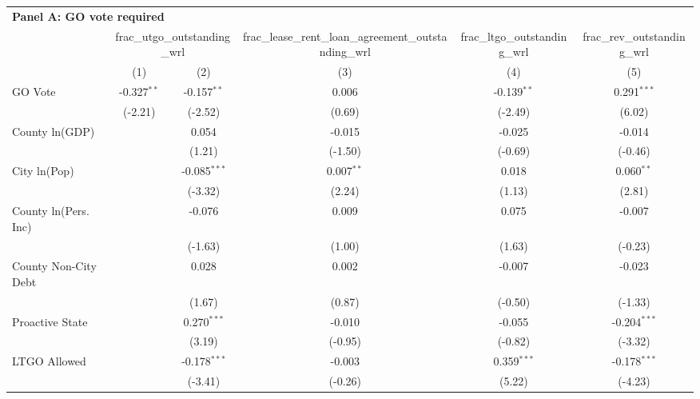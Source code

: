 \begingroup
\centering
\begin{tabular*}{\textwidth}{@{\extracolsep{\fill}}lccccc}
\multicolumn{5}{l}{\textbf{Panel A: GO vote required}}\\

\addlinespace
   \toprule
    & \multicolumn{2}{c}{frac\_utgo\_outstanding\_wrl} & frac\_lease\_rent\_loan\_agreement\_outstanding\_wrl & frac\_ltgo\_outstanding\_wrl & frac\_rev\_outstanding\_wrl\\
   \cmidrule(lr){2-3}\cmidrule(lr){4-4}\cmidrule(lr){5-5}\cmidrule(lr){6-6}
                        & (1)           & (2)            & (3)          & (4)           & (5)\\  
   \midrule 
   GO Vote              & -0.327$^{**}$ & -0.157$^{**}$  & 0.006        & -0.139$^{**}$ & 0.291$^{***}$\\   
                        & (-2.21)      & (-2.52)       & (0.69)      & (-2.49)      & (6.02)\\   
   County ln(GDP)       &               & 0.054          & -0.015       & -0.025        & -0.014\\   
                        &               & (1.21)        & (-1.50)     & (-0.69)      & (-0.46)\\   
   City ln(Pop)         &               & -0.085$^{***}$ & 0.007$^{**}$ & 0.018         & 0.060$^{**}$\\   
                        &               & (-3.32)       & (2.24)      & (1.13)       & (2.81)\\   
   County ln(Pers. Inc) &               & -0.076         & 0.009        & 0.075         & -0.007\\   
                        &               & (-1.63)       & (1.00)      & (1.63)       & (-0.23)\\   
   County Non-City Debt &               & 0.028          & 0.002        & -0.007        & -0.023\\   
                        &               & (1.67)        & (0.87)      & (-0.50)      & (-1.33)\\   
   Proactive State      &               & 0.270$^{***}$  & -0.010       & -0.055        & -0.204$^{***}$\\   
                        &               & (3.19)        & (-0.95)     & (-0.82)      & (-3.32)\\   
   LTGO Allowed         &               & -0.178$^{***}$ & -0.003       & 0.359$^{***}$ & -0.178$^{***}$\\   
                        &               & (-3.41)       & (-0.26)     & (5.22)       & (-4.23)\\   

\end{tabular*}
